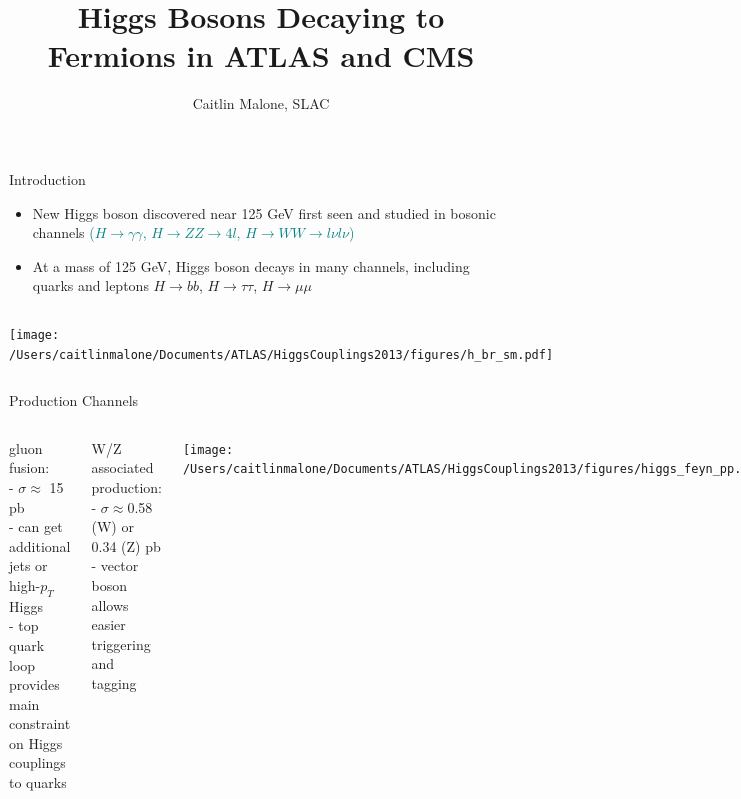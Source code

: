 \documentclass{beamer}
\title{Higgs Bosons Decaying to Fermions in ATLAS and CMS}
\author{Caitlin Malone, SLAC}
\institute{on behalf of the ATLAS Collaboration\\Higgs Couplings 2013, Freiburg\\14 October 2013 }
\date{}
\begin{document}
\frame{\titlepage}


\begin{frame}{Introduction}
	\begin{itemize} \scriptsize
		\item New Higgs boson discovered near 125 GeV first seen and studied in bosonic channels \textcolor{Teal}{($H\rightarrow\gamma\gamma$, $H\rightarrow ZZ\rightarrow 4l$, $H\rightarrow WW \rightarrow l\nu l \nu$)}
		\item At a mass of 125 GeV, Higgs boson decays in many channels, including \textcolor{BrickRed}{quarks and leptons $H\rightarrow bb$, $H\rightarrow\tau\tau$, $H\rightarrow\mu\mu$}
	\end{itemize}
	\begin{columns}[c]
			\texttt{[image: /Users/caitlinmalone/Documents/ATLAS/HiggsCouplings2013/figures/h\_br\_sm.pdf]}
	\end{columns}

\end{frame}


\begin{frame}{Production Channels}
	\begin{columns}[c]
		\scriptsize \textcolor{BrickRed}{gluon fusion:} \\
		- $\sigma\approx$ 15 pb \\
		- can get additional jets or high-$p_T$ Higgs \\
		- top quark loop provides main constraint on Higgs couplings to quarks
		\vspace{1cm}
		
		\textcolor{BrickRed}{W/Z associated production:} \\
		- $\sigma\approx$0.58 (W) or 0.34 (Z) pb \\
		- vector boson allows easier triggering and tagging
		
		\texttt{[image: /Users/caitlinmalone/Documents/ATLAS/HiggsCouplings2013/figures/higgs\_feyn\_pp.pdf]}
		
		
		\scriptsize \textcolor{BrickRed}{ttH:}\\
		- $\sigma\approx$ 0.086 pb\\
		- top quarks allow easier triggering and tagging
		
		\vspace{2cm}
		
		\textcolor{BrickRed}{Vector Boson Fusion:} \\
		- $\sigma\approx$1.2 pb \\
		- forward jets provide unique signature		
	\end{columns}
\end{frame}
\end{document}
